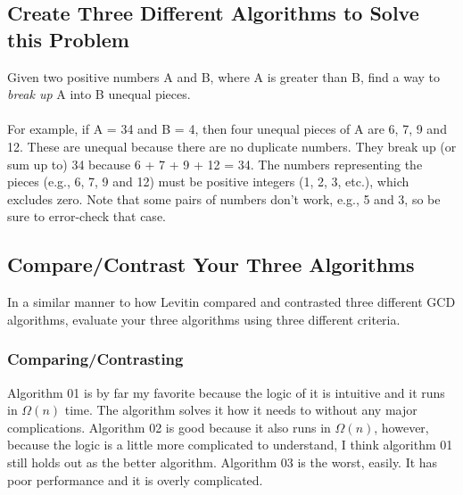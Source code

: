 \documentclass[12pt]{amsart}
\begin{document}
\subsection{Create Three Different Algorithms to Solve this Problem}
Given two positive numbers A and B, where A is greater than B, find a way to \textit{break up} A into B unequal pieces.\\\\For example, if A = 34 and B = 4, then four unequal pieces of A are 6, 7, 9 and 12. These are unequal because there are no duplicate numbers. They break up (or sum up to) 34 because 6 + 7 + 9 + 12 = 34. The numbers representing the pieces (e.g., 6, 7, 9 and 12) must be positive integers (1, 2, 3, etc.), which excludes zero. Note that some pairs of numbers don't work, e.g., 5 and 3, so be sure to error-check that case.

\subsection{Compare/Contrast Your Three Algorithms}
In a similar manner to how Levitin compared and contrasted three different GCD algorithms, evaluate your three algorithms using three different criteria.

\subsubsection{Comparing/Contrasting}
Algorithm 01 is by far my favorite because the logic of it is intuitive and it runs in $\Omega(n)$ time. The algorithm solves it how it needs to without any major complications. Algorithm 02 is good because it also runs in $\Omega(n)$, however, because the logic is a little more complicated to understand, I think algorithm 01 still holds out as the  better algorithm. Algorithm 03 is the worst, easily. It has poor performance and it is overly complicated. 
\end{document}
